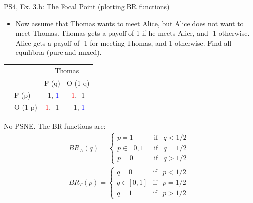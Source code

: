 \begin{frame}{PS4, Ex. 3.b: The Focal Point (plotting BR functions)}
  \begin{multicols}{2}
    \begin{itemize}
      \item[(b)] Now assume that Thomas wants to meet Alice, but Alice does not want to meet Thomas. Thomas gets a payoff of 1 if he meets Alice, and -1 otherwise. Alice gets a payoff of -1 for meeting Thomas, and 1 otherwise. Find all equilibria (pure and mixed).
    \end{itemize}
    \begin{table}
      \begin{tabular}{cl|c|c|}
        & \multicolumn{1}{c}{} & \multicolumn{2}{c}{\color{blue}Thomas}\\
        & \multicolumn{1}{c}{} & \multicolumn{1}{c}{F (q)} & \multicolumn{1}{c}{O (1-q)} \\\cline{3-4}
        \parbox[t]{1mm}{}
        & F (p) & -1, \textcolor{blue}{1} & \textcolor{red}{1}, -1 \\
        & O (1-p) & \textcolor{red}{1}, -1 & -1, \textcolor{blue}{1} \\
      \end{tabular}
    \end{table}
    No PSNE. The BR functions are:
    \begin{align*}
      BR_A(q)=\left\{ \begin{array}{lcl}
          p=1       & \text{if} & q<1/2 \\
          p\in[0,1] & \text{if} & q=1/2 \\
          p=0       & \text{if} & q>1/2
      \end{array}\right. \\
      BR_T(p)=\left\{ \begin{array}{lcl}
          q=0       & \text{if} & p<1/2  \\
          q\in[0,1] & \text{if} & p=1/2 \\
          q=1       & \text{if} & p>1/2
      \end{array}\right.
    \end{align*}
    \vfill\null \columnbreak

\end{multicols}
\end{frame}
